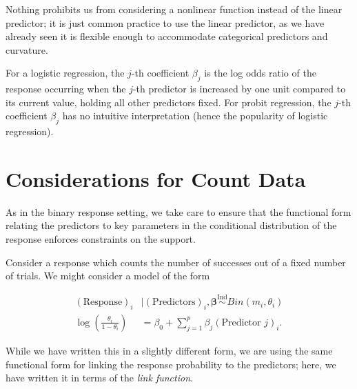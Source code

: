 \documentclass[
  letterpaper,
  DIV=11,
  numbers=noendperiod]{scrreprt}
\theoremstyle{definition}
\theoremstyle{plain}
\theoremstyle{definition}
\theoremstyle{remark}
\begin{document}
Nothing prohibits us from considering a nonlinear function instead of
the linear predictor; it is just common practice to use the linear
predictor, as we have already seen it is flexible enough to accommodate
categorical predictors and curvature.

For a logistic regression, the \(j\)-th coefficient \(\beta_j\) is the
log odds ratio of the response occurring when the \(j\)-th predictor is
increased by one unit compared to its current value, holding all other
predictors fixed. For probit regression, the \(j\)-th coefficient
\(\beta_j\) has no intuitive interpretation (hence the popularity of
logistic regression).

\hypertarget{considerations-for-count-data}{%
\section{Considerations for Count
Data}\label{considerations-for-count-data}}

As in the binary response setting, we take care to ensure that the
functional form relating the predictors to key parameters in the
conditional distribution of the response enforces constraints on the
support.

Consider a response which counts the number of successes out of a fixed
number of trials. We might consider a model of the form

\[
\begin{aligned}
  (\text{Response})_i &\mid (\text{Predictors})_i, \boldsymbol{\beta} \stackrel{\text{Ind}}{\sim}Bin\left(m_i, \theta_i\right) \\
\log\left(\frac{\theta_i}{1-\theta_i}\right) &= \beta_0 + \sum_{j=1}^{p} \beta_j (\text{Predictor } j)_i.
\end{aligned}
\]

While we have written this in a slightly different form, we are using
the same functional form for linking the response probability to the
predictors; here, we have written it in terms of the \emph{link
function}.
\end{document}
